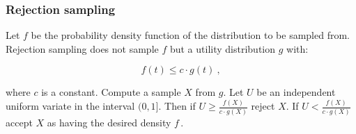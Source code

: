 \documentclass[a4paper]{scrartcl}
\begin{document}
% 
% 
% 

\subsubsection*{Rejection sampling}
Let $f$ be the probability density function of the distribution to be sampled from. Rejection sampling does not sample $f$ but a utility distribution $g$ with:

\begin{equation*}
f(t) \leq c \cdot g(t)~,
\end{equation*}

where $c$ is a constant. Compute a sample $X$ from $g$. Let $U$ be an independent uniform variate in the interval $(0, 1]$. Then if $U \geq \frac{f(X)}{c \cdot g(X)}$ reject $X$. If   $U < \frac{f(X)}{c \cdot g(X)}$ accept $X$ as having the desired density $f$\,\citep{Devroye1986, Flury1990, Knuth1997b}.
\end{document}
